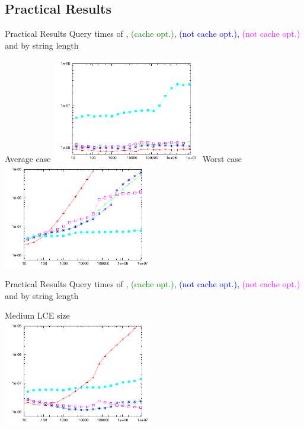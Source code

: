 \documentclass{beamer}
\begin{document}
\subsection{Practical Results}
\begin{frame}{Practical Results}
    Query times of
    \textcolor{red}{},
    \textcolor{green}{\fprint[2] (cache opt.)},
    \textcolor{blue}{\fprint[3] (not cache opt.)},
    \textcolor{magenta}{\fprint[\logceil] (not cache opt.)} and
    \textcolor{cyan}{}
    by string length
    \begin{multicols}{2}{
        \begin{center}
            Average case
            \includegraphics[width=0.49\textwidth,type=pdf,ext=.pdf,read=.pdf]{../src/results/length-slides-cache-rand10.plt}
            \newpage
            Worst case
            \includegraphics[width=0.49\textwidth,type=pdf,ext=.pdf,read=.pdf]{../src/results/length-slides-cache-alla.plt}
        \end{center}
    }
    \end{multicols}
\end {frame}

\begin{frame}{Practical Results}
    Query times of
    \textcolor{red}{},
    \textcolor{green}{\fprint[2] (cache opt.)},
    \textcolor{blue}{\fprint[3] (not cache opt.)},
    \textcolor{magenta}{\fprint[\logceil] (not cache opt.)} and
    \textcolor{cyan}{}
    by string length
    \begin{center}
        Medium LCE size\\
        \includegraphics[width=0.49\textwidth,type=pdf,ext=.pdf,read=.pdf]{../src/results/length-slides-cache-repeat-pow.plt}
    \end{center}
\end {frame}
\end{document}
